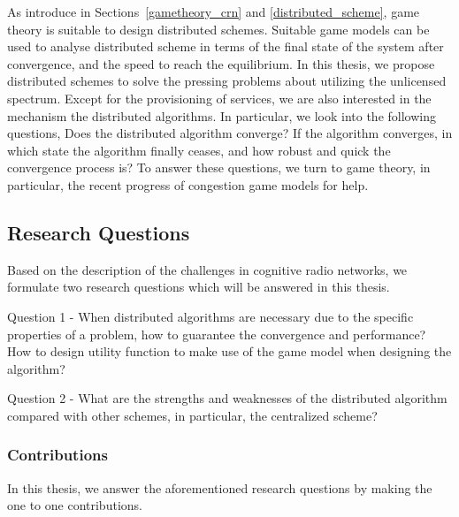 As introduce in Sections~\ref{gametheory_crn} and \ref{distributed_scheme}, game theory is suitable to design distributed schemes.
Suitable game models can be used to analyse distributed scheme in terms of the final state of the system after convergence, and the speed to reach the equilibrium.
In this thesis, we propose distributed schemes to solve the pressing problems about utilizing the unlicensed spectrum.
Except for the provisioning of services, we are also interested in the mechanism the distributed algorithms.
In particular, we look into the following questions, 
Does the distributed algorithm converge? 
If the algorithm converges, in which state the algorithm finally ceases, and how robust and quick the convergence process is?
To answer these questions, we turn to game theory, in particular, the recent progress of congestion game models for help.




\subsection{Research Questions}
Based on the description of the challenges in cognitive radio networks, we formulate two research questions which will be answered in this thesis.

Question 1 - When distributed algorithms are necessary due to the specific properties of a problem, how to guarantee the convergence and performance? How to design utility function to make use of the game model when designing the algorithm?

Question 2 - What are the strengths and weaknesses of the distributed algorithm compared with other schemes, in particular, the centralized scheme?

%
%



\subsubsection{Contributions}
In this thesis, we answer the aforementioned research questions by making the one to one contributions.

